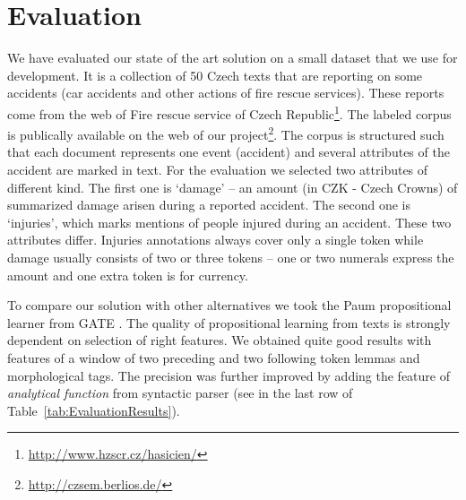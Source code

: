 \documentclass[runningheads,a4paper]{llncs}
\begin{document}
\section{Evaluation}
\label{sec:evaluation}

We have evaluated our state of the art solution on a small dataset that we use for development. It is a collection of 50 Czech texts that are reporting on some accidents (car accidents and other actions of fire rescue services). These reports come from the web of Fire rescue service of Czech Republic\footnote{\url{http://www.hzscr.cz/hasicien/}}. The labeled corpus is publically available on the web of our project\footnote{\url{http://czsem.berlios.de/}}.
The corpus is structured such that each document represents one event (accident) and several attributes of the accident are marked in text. For the evaluation we selected two attributes of different kind. The first one is `damage' -- an amount (in CZK - Czech Crowns) of summarized damage arisen during a reported accident. The second one is `injuries', which marks mentions of people injured during an accident. These two attributes differ. Injuries annotations always cover only a single token while damage usually consists of two or three tokens -- one or two numerals express the amount and one extra token is for currency.


To compare our solution with other alternatives we took the Paum propositional learner from GATE \cite{Li:Paum}. The quality of propositional learning from texts is strongly dependent on selection of right features. We obtained quite good results with features of a window of two preceding and two following token lemmas and morphological tags. The precision was further improved by adding the feature of \emph{analytical function} from syntactic parser (see in the last row of Table~\ref{tab:EvaluationResults}).
\end{document}
